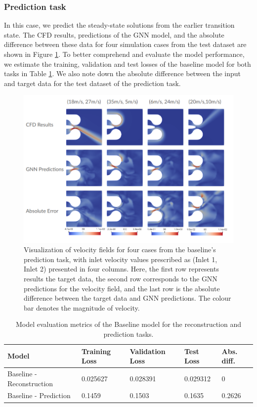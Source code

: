 \subsubsection{Prediction task}
In this case, we predict the steady-state solutions from the earlier transition state. The CFD results, predictions of the GNN model, and the absolute difference between these data for four simulation cases from the test dataset are shown in Figure \ref{blpred}. To better comprehend and evaluate the model performance, we estimate the training, validation and test losses of the baseline model for both tasks in Table \ref{table:perform}. We also note down the absolute difference between the input and target data for the test dataset of the prediction task.   
\begin{figure}[ht]
    \centering
    \includegraphics[width=14cm]{images/Methodology/Baselineprediction.png}
    \caption{Visualization of velocity fields for four cases from the baseline's prediction task, with inlet velocity values prescribed as (Inlet 1, Inlet 2) presented in four columns. Here, the first row represents results the target data, the second row corresponds to the GNN predictions for the velocity field, and the last row is the absolute difference between the target data and GNN predictions. The colour bar denotes the magnitude of velocity. } 
    \label{blpred}
\end{figure}
\begin{table}[ht]
    \centering
    \caption{Model evaluation metrics of the Baseline model for the reconstruction and prediction tasks.} 
    \label{table:perform}
    \begin{tabular}{|l|l|l|l|l|}
    \hline
    \textbf{Model} & \textbf{Training Loss} & \textbf{Validation Loss} & \textbf{Test Loss} & \textbf{Abs. diff.} \\
    \hline
    Baseline - Reconstruction & 0.025627 & 0.028391 & 0.029312 & 0\\
    \hline
    Baseline - Prediction & 0.1459 & 0.1503 & 0.1635 & 0.2626\\
    \hline
    \end{tabular}
    \end{table}  

